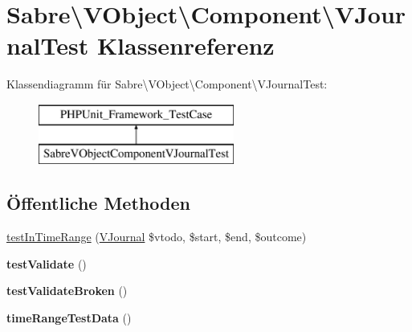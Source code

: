 \hypertarget{class_sabre_1_1_v_object_1_1_component_1_1_v_journal_test}{}\section{Sabre\textbackslash{}V\+Object\textbackslash{}Component\textbackslash{}V\+Journal\+Test Klassenreferenz}
\label{class_sabre_1_1_v_object_1_1_component_1_1_v_journal_test}
Klassendiagramm für Sabre\textbackslash{}V\+Object\textbackslash{}Component\textbackslash{}V\+Journal\+Test\+:\begin{figure}[H]
\begin{center}
\leavevmode
\includegraphics[height=2.000000cm]{class_sabre_1_1_v_object_1_1_component_1_1_v_journal_test}
\end{center}
\end{figure}
\subsection*{Öffentliche Methoden}
\begin{DoxyCompactItemize}
\item 
\mbox{\hyperlink{class_sabre_1_1_v_object_1_1_component_1_1_v_journal_test_a9990d4a50be53ce548ff038dce94acd3}{test\+In\+Time\+Range}} (\mbox{\hyperlink{class_sabre_1_1_v_object_1_1_component_1_1_v_journal}{V\+Journal}} \$vtodo, \$start, \$end, \$outcome)
\item 
\mbox{\label{class_sabre_1_1_v_object_1_1_component_1_1_v_journal_test_a579a8ff46a07d91cbcd1d8a96abc29e2}} 
{\bfseries test\+Validate} ()
\item 
\mbox{\label{class_sabre_1_1_v_object_1_1_component_1_1_v_journal_test_a9c1ec3ffa6bf006d555ec97a5c05788c}} 
{\bfseries test\+Validate\+Broken} ()
\item 
\mbox{\label{class_sabre_1_1_v_object_1_1_component_1_1_v_journal_test_ab1601725863b21b78422de8cb46ae5b4}} 
{\bfseries time\+Range\+Test\+Data} ()
\end{DoxyCompactItemize}


